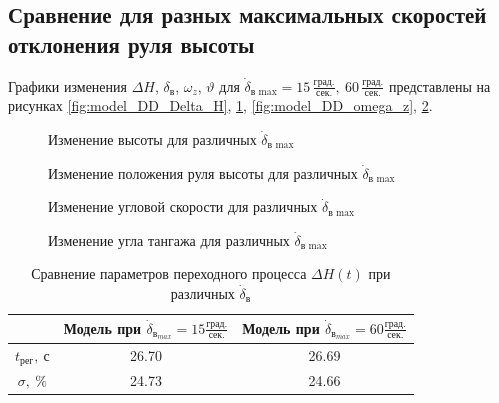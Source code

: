 \subsection{Сравнение для разных максимальных скоростей отклонения руля высоты}

Графики изменения $\Delta H$, $\delta_{в}$, $\omega_z$, $\vartheta$ для
$\dot{\delta}_\text{в max} = 15\, \frac{\text{град.}}{\text{сек.}},\ 60\, \frac{\text{град.}}{\text{сек.}}$
представлены на рисунках \ref{fig:model_DD_Delta_H},
\ref{fig:model_DD_delta_elevator}, \ref{fig:model_DD_omega_z}, \ref{fig:model_DD_theta}.

\begin{figure}[H]
    \begin{minipage}{0.48\textwidth}
    \centering
    \resizebox{1.1\linewidth}{!}{}
    \caption{Изменение высоты для различных $\dot{\delta}_\text{в max}$}
    \label{fig:model_DD_Delta_H}
    \end{minipage}
    \hfill
    \begin{minipage}{0.48\textwidth}
    \centering
    \resizebox{1.1\linewidth}{!}{}
    \caption{Изменение положения руля высоты для различных $\dot{\delta}_\text{в max}$}
    \label{fig:model_DD_delta_elevator}
    \end{minipage}
\end{figure}
\begin{figure}[H]
    \begin{minipage}{0.48\textwidth}
    \centering
    \resizebox{1.1\linewidth}{!}{}
    \caption{Изменение угловой скорости для различных $\dot{\delta}_\text{в max}$}
    \label{fig:model_DD_omega_z}
    \end{minipage}
    \hfill
    \begin{minipage}{0.48\textwidth}
    \centering
    \resizebox{1.1\linewidth}{!}{}
    \caption{Изменение угла тангажа для различных $\dot{\delta}_\text{в max}$}
    \label{fig:model_DD_theta}
\end{minipage}
\end{figure}

\begin{table}[H]
    \centering
    \caption{Сравнение параметров переходного процесса $\Delta H(t)$ при различных $\dot{\delta}_{в}$}
    \label{tab:stat_DD}

    \begin{tabular}{|c|c|c|}
        \hline
        {} &  Модель при $\dot{\delta}_{{в}_{max}}=15 \frac{град.}{сек.}$ &  Модель при $\dot{\delta}_{{в}_{max}}=60 \frac{град.}{сек.}$ \\
        \hline
        $t_{рег},\ с$ & 26.70 & 26.69 \\
        \hline
        $\sigma,\ \%$ & 24.73 & 24.66 \\
        \hline
    \end{tabular}
\end{table}

